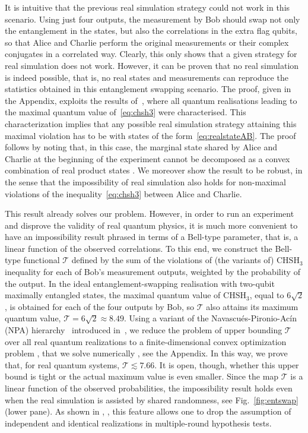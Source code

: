 \documentclass[onecolumn,prx,amsmath,amssymb]{revtex4-2}
\begin{document}
It is intuitive that the previous real simulation strategy could not work in this scenario. Using just four outputs, the measurement by Bob should swap not only the entanglement in the states, but also the correlations in the extra flag qubits, so that Alice and Charlie perform the original measurements or their complex conjugates in a correlated way. Clearly, this only shows that a given strategy for real simulation does not work. However, it can be proven that no real simulation is indeed possible, that is, no real states and measurements can reproduce the statistics obtained in this entanglement swapping scenario. The proof, given in the Appendix, exploits the results of~\cite{self_testing}, where all quantum realisations leading to the maximal quantum value of~\eqref{eq:chsh3} were characterised. This characterization implies that any possible real simulation strategy attaining this maximal violation has to be with states of the form~\eqref{eq:realstateAB}. The proof follows by noting that, in this case, the marginal state shared by Alice and Charlie at the beginning of the experiment cannot be decomposed as a convex combination of real product states \cite{real_entanglement}. We moreover show the result to be robust, in the sense that the impossibility of real simulation also holds for non-maximal violations of the inequality~\eqref{eq:chsh3} between Alice and Charlie.

This result already solves our problem. However, in order to run an experiment and disprove the validity of real quantum physics, it is much more convenient to have an impossibility result phrased in terms of a Bell-type parameter, that is, a linear function of the observed correlations. To this end, we construct the Bell-type functional $\mathscr{T}$ defined by the sum of the violations of (the variants of) $\text{CHSH}_3$ inequality for each of Bob's measurement outputs, weighted by the probability of the output. In the ideal entanglement-swapping realisation with two-qubit maximally entangled states, the maximal quantum value of $\text{CHSH}_3$, equal to $6\sqrt 2$, is obtained for each of the four outputs by Bob, so $\mathscr{T}$ also attains its maximum quantum value, $\mathscr{T}=6\sqrt 2\approx 8.49$. Using a variant of the Navascu\'es-Pironio-Ac\'in (NPA) hierarchy~\cite{npa, npa2,NOP} introduced in~\cite{moroder}, we reduce the problem of upper bounding $\mathscr{T}$ over all real quantum realizations to a finite-dimensional convex optimization problem \cite{sdp}, that we solve numerically \cite{yalmip, mosek}, see the Appendix. In this way, we prove that, for real quantum systems, $\mathscr{T}\lesssim 7.66$. It is open, though, whether this upper bound is tight or the actual maximum value is even smaller. Since the map $\mathscr{T}$ is a linear function of the observed probabilities, the impossibility result holds even when the real simulation is assisted by shared randomness, see Fig.~\ref{fig:entswap} (lower pane). As shown in \cite{Elkouss}, \cite{Mateus}, this feature allows one to drop the assumption of independent and identical realizations in multiple-round hypothesis tests.
\end{document}
